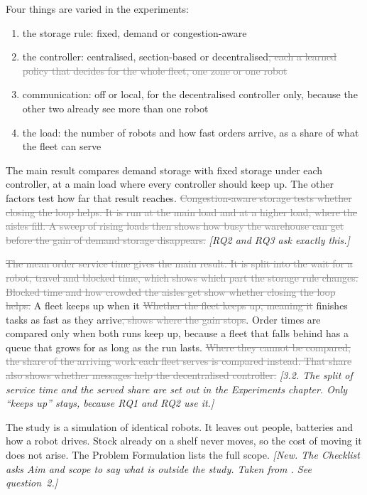 \documentclass[11pt,a4paper]{article}
\newcommand{\new}[1]{\textcolor{newc}{#1}}
\newcommand{\old}[1]{\textcolor{gray}{\sout{#1}}}
\newcommand{\note}[1]{{\small\itshape [#1]}}
\newcommand{\lab}[1]{\textsf{\footnotesize\detokenize{#1}}}
\begin{document}
Four things are varied in the experiments:
\begin{enumerate}[nosep]
    \item the storage rule: fixed, demand or congestion-aware
    \item the controller: centralised, section-based or decentralised\old{,
      each a learned policy that decides for the whole fleet, one zone or one
      robot}
    \item communication: off or local, for the decentralised controller
      only, because the other two already see more than one robot
    \item the load: the number of robots and how fast orders arrive, as a
      share of what the fleet can serve
\end{enumerate}
The main result compares demand storage with fixed storage under each
controller, at a main load where every controller should keep up. The
other factors test how far that result reaches. \old{Congestion-aware
storage tests whether closing the loop helps. It is run at the main load
and at a higher load, where the aisles fill. A sweep of rising loads then
shows how busy the warehouse can get before the gain of demand storage
disappears.}
\note{RQ2 and RQ3 ask exactly this.}

\old{The mean order service time gives the main result. It is split into the
wait for a robot, travel and blocked time, which shows which part the
storage rule changes. Blocked time and how crowded the aisles get show
whether closing the loop helps.} \new{A fleet keeps up when it} \old{Whether
the fleet keeps up, meaning it} finishes tasks as fast as they arrive\old{,
shows where the gain stops}. Order times are compared only when both runs
keep up, because a fleet that falls behind has a queue that grows for as
long as the run lasts. \old{Where they cannot be compared, the share of the
arriving work each fleet serves is compared instead. That share also shows
whether messages help the decentralised controller.}
\note{3.2. The split of service time and the served share are set out in
the Experiments chapter. Only ``keeps up'' stays, because RQ1 and RQ2 use
it.}

\new{The study is a simulation of identical robots. It leaves out people,
batteries and how a robot drives. Stock already on a shelf never moves, so
the cost of moving it does not arise. The Problem Formulation lists the
full scope.}
\note{New. The Checklist asks Aim and scope to say what is outside the
study. Taken from \lab{sec:pf:scope}. See question~2.}
\end{document}
